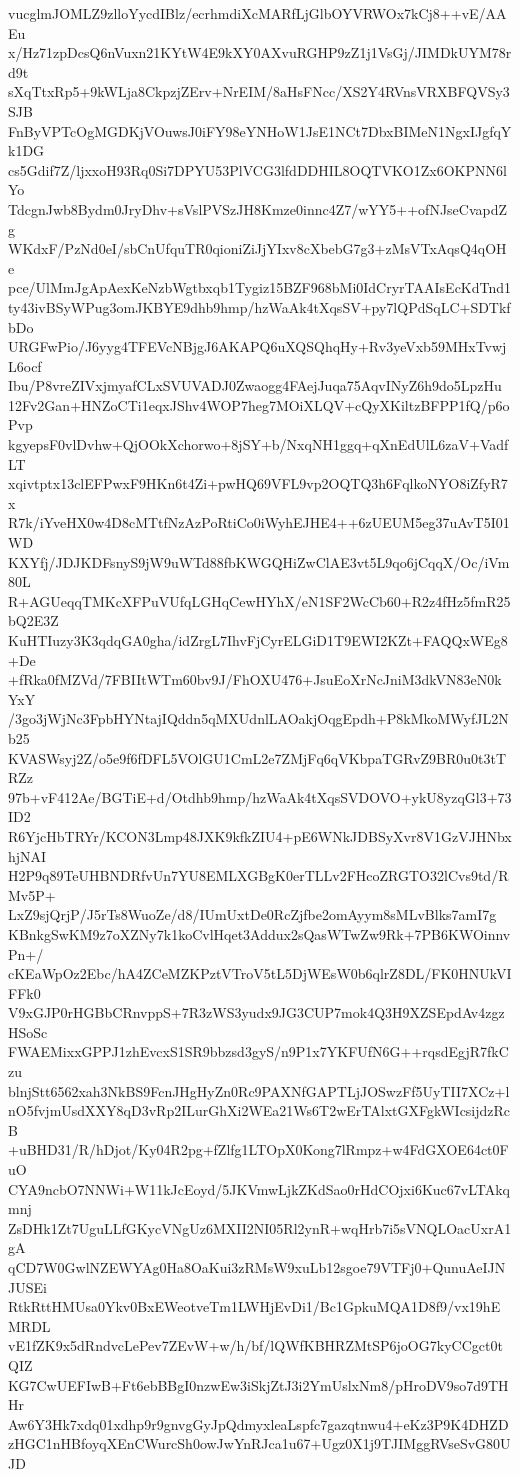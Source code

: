 vucglmJOMLZ9zlloYycdIBlz/ecrhmdiXcMARfLjGlbOYVRWOx7kCj8++vE/AAEu
x/Hz71zpDcsQ6nVuxn21KYtW4E9kXY0AXvuRGHP9zZ1j1VsGj/JIMDkUYM78rd9t
sXqTtxRp5+9kWLja8CkpzjZErv+NrEIM/8aHsFNcc/XS2Y4RVnsVRXBFQVSy3SJB
FnByVPTcOgMGDKjVOuwsJ0iFY98eYNHoW1JsE1NCt7DbxBIMeN1NgxIJgfqYk1DG
cs5Gdif7Z/ljxxoH93Rq0Si7DPYU53PlVCG3lfdDDHIL8OQTVKO1Zx6OKPNN6lYo
TdcgnJwb8Bydm0JryDhv+sVslPVSzJH8Kmze0innc4Z7/wYY5++ofNJseCvapdZg
WKdxF/PzNd0eI/sbCnUfquTR0qioniZiJjYIxv8cXbebG7g3+zMsVTxAqsQ4qOHe
pce/UlMmJgApAexKeNzbWgtbxqb1Tygiz15BZF968bMi0IdCryrTAAIsEcKdTnd1
ty43ivBSyWPug3omJKBYE9dhb9hmp/hzWaAk4tXqsSV+py7lQPdSqLC+SDTkfbDo
URGFwPio/J6yyg4TFEVcNBjgJ6AKAPQ6uXQSQhqHy+Rv3yeVxb59MHxTvwjL6ocf
Ibu/P8vreZIVxjmyafCLxSVUVADJ0Zwaogg4FAejJuqa75AqvINyZ6h9do5LpzHu
12Fv2Gan+HNZoCTi1eqxJShv4WOP7heg7MOiXLQV+cQyXKiltzBFPP1fQ/p6oPvp
kgyepsF0vlDvhw+QjOOkXchorwo+8jSY+b/NxqNH1ggq+qXnEdUlL6zaV+VadfLT
xqivtptx13clEFPwxF9HKn6t4Zi+pwHQ69VFL9vp2OQTQ3h6FqlkoNYO8iZfyR7x
R7k/iYveHX0w4D8cMTtfNzAzPoRtiCo0iWyhEJHE4++6zUEUM5eg37uAvT5I01WD
KXYfj/JDJKDFsnyS9jW9uWTd88fbKWGQHiZwClAE3vt5L9qo6jCqqX/Oc/iVm80L
R+AGUeqqTMKcXFPuVUfqLGHqCewHYhX/eN1SF2WcCb60+R2z4fHz5fmR25bQ2E3Z
KuHTIuzy3K3qdqGA0gha/idZrgL7IhvFjCyrELGiD1T9EWI2KZt+FAQQxWEg8+De
+fRka0fMZVd/7FBIItWTm60bv9J/FhOXU476+JsuEoXrNcJniM3dkVN83eN0kYxY
/3go3jWjNc3FpbHYNtajIQddn5qMXUdnlLAOakjOqgEpdh+P8kMkoMWyfJL2Nb25
KVASWsyj2Z/o5e9f6fDFL5VOlGU1CmL2e7ZMjFq6qVKbpaTGRvZ9BR0u0t3tTRZz
97b+vF412Ae/BGTiE+d/Otdhb9hmp/hzWaAk4tXqsSVDOVO+ykU8yzqGl3+73ID2
R6YjcHbTRYr/KCON3Lmp48JXK9kfkZIU4+pE6WNkJDBSyXvr8V1GzVJHNbxhjNAI
H2P9q89TeUHBNDRfvUn7YU8EMLXGBgK0erTLLv2FHcoZRGTO32lCvs9td/RMv5P+
LxZ9sjQrjP/J5rTs8WuoZe/d8/IUmUxtDe0RcZjfbe2omAyym8sMLvBlks7amI7g
KBnkgSwKM9z7oXZNy7k1koCvlHqet3Addux2sQasWTwZw9Rk+7PB6KWOinnvPn+/
cKEaWpOz2Ebc/hA4ZCeMZKPztVTroV5tL5DjWEsW0b6qlrZ8DL/FK0HNUkVIFFk0
V9xGJP0rHGBbCRnvppS+7R3zWS3yudx9JG3CUP7mok4Q3H9XZSEpdAv4zgzHSoSc
FWAEMixxGPPJ1zhEvcxS1SR9bbzsd3gyS/n9P1x7YKFUfN6G++rqsdEgjR7fkCzu
blnjStt6562xah3NkBS9FcnJHgHyZn0Rc9PAXNfGAPTLjJOSwzFf5UyTII7XCz+l
nO5fvjmUsdXXY8qD3vRp2ILurGhXi2WEa21Ws6T2wErTAlxtGXFgkWIcsijdzRcB
+uBHD31/R/hDjot/Ky04R2pg+fZlfg1LTOpX0Kong7lRmpz+w4FdGXOE64ct0FuO
CYA9ncbO7NNWi+W11kJcEoyd/5JKVmwLjkZKdSao0rHdCOjxi6Kuc67vLTAkqmnj
ZsDHk1Zt7UguLLfGKycVNgUz6MXII2NI05Rl2ynR+wqHrb7i5sVNQLOacUxrA1gA
qCD7W0GwlNZEWYAg0Ha8OaKui3zRMsW9xuLb12sgoe79VTFj0+QunuAeIJNJUSEi
RtkRttHMUsa0Ykv0BxEWeotveTm1LWHjEvDi1/Bc1GpkuMQA1D8f9/vx19hEMRDL
vE1fZK9x5dRndvcLePev7ZEvW+w/h/bf/lQWfKBHRZMtSP6joOG7kyCCgct0tQIZ
KG7CwUEFIwB+Ft6ebBBgI0nzwEw3iSkjZtJ3i2YmUslxNm8/pHroDV9so7d9THHr
Aw6Y3Hk7xdq01xdhp9r9gnvgGyJpQdmyxleaLspfc7gazqtnwu4+eKz3P9K4DHZD
zHGC1nHBfoyqXEnCWurcSh0owJwYnRJca1u67+Ugz0X1j9TJIMggRVseSvG80UJD
